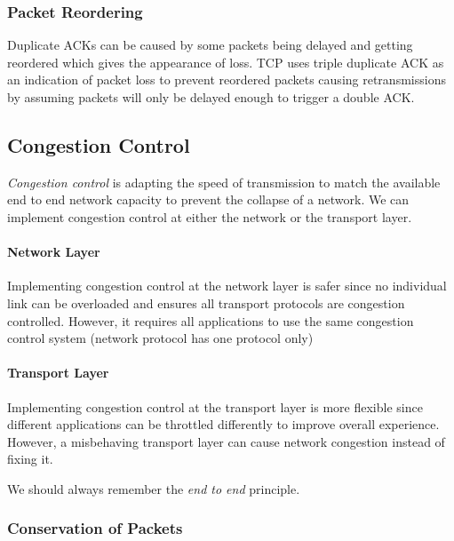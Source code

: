 \subsubsection{Packet Reordering}\label{ssub:packet_reordering}

Duplicate ACKs can be caused by some packets being delayed and getting reordered which gives the appearance of loss.
TCP uses triple duplicate ACK as an indication of packet loss to prevent reordered packets causing retransmissions by assuming packets will only be delayed enough to trigger a double ACK.

\subsection{Congestion Control}\label{sub:congestion_control}

\emph{Congestion control} is adapting the speed of transmission to match the available end to end network capacity to prevent the collapse of a network.
We can implement congestion control at either the network or the transport layer.

\paragraph{Network Layer}\label{par:network_layer}

Implementing congestion control at the network layer is safer since no individual link can be overloaded and ensures all transport protocols are congestion controlled.
However, it requires all applications to use the same congestion control system (network protocol has one protocol only)

\paragraph{Transport Layer}\label{par:transport_layer}

Implementing congestion control at the transport layer is more flexible since different applications can be throttled differently to improve overall experience.
However, a misbehaving transport layer can cause network congestion instead of fixing it.

\begin{note}
	We should always remember the \emph{end to end} principle.
\end{note}

\subsubsection{Conservation of Packets}\label{ssub:conservation_of_packets}

